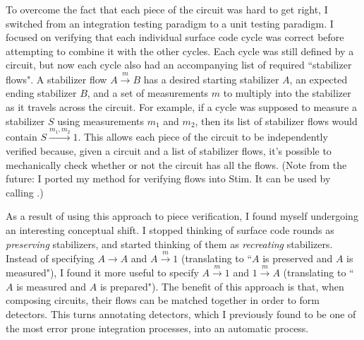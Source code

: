 \documentclass[onecolumn,unpublished,a4paper]{quantumarticle}
\theoremstyle{definition}
\theoremstyle{definition}
\theoremstyle{definition}
\begin{document}
To overcome the fact that each piece of the circuit was hard to get right, I switched from an integration testing paradigm to a unit testing paradigm.
I focused on verifying that each individual surface code cycle was correct before attempting to combine it with the other cycles.
Each cycle was still defined by a circuit, but now each cycle also had an accompanying list of required ``stabilizer flows".
A stabilizer flow $A \xrightarrow{m} B$ has a desired starting stabilizer $A$, an expected ending stabilizer $B$, and a set of measurements $m$ to multiply into the stabilizer as it travels across the circuit.
For example, if a cycle was supposed to measure a stabilizer $S$ using measurements $m_1$ and $m_2$, then its list of stabilizer flows would contain $S \xrightarrow{m_1, m_2} 1$.
This allows each piece of the circuit to be independently verified because, given a circuit and a list of stabilizer flows, it's possible to mechanically check whether or not the circuit has all the flows.
(Note from the future: I ported my method for verifying flows into Stim. It can be used by calling \href{https://github.com/quantumlib/Stim/blob/main/doc/python_api_reference_vDev.md#stim.Circuit.has_all_flows}{}.)

As a result of using this approach to piece verification, I found myself undergoing an interesting conceptual shift.
I stopped thinking of surface code rounds as \emph{preserving} stabilizers, and started thinking of them as \emph{recreating} stabilizers.
Instead of specifying $A \rightarrow A$ and $A \xrightarrow{m} 1$ (translating to ``$A$ is preserved and $A$ is measured"), I found it more useful to specify $A \xrightarrow{m} 1$ and $1 \xrightarrow{m} A$ (translating to ``$A$ is measured and $A$ is prepared").
The benefit of this approach is that, when composing circuits, their flows can be matched together in order to form detectors.
This turns annotating detectors, which I previously found to be one of the most error prone integration processes, into an automatic process.
\end{document}

